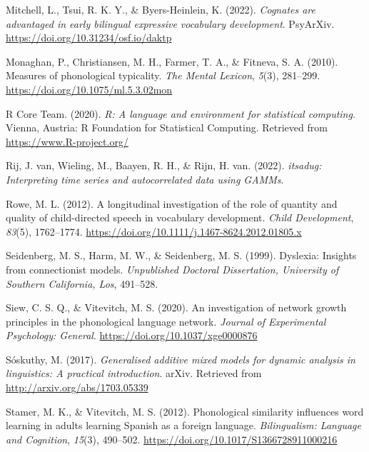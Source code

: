 \documentclass[
  man]{apa6}
\newlength{\cslhangindent}
\newlength{\cslentryspacingunit} %
\newenvironment{CSLReferences}[2] %
 {%
  \setlength{\parindent}{0pt}
  \ifodd #1
  \let\oldpar\par
  \def\par{\hangindent=\cslhangindent\oldpar}
  \fi
  \setlength{\parskip}{#2\cslentryspacingunit}
 }%
 {}
\begin{document}
\begin{CSLReferences}{1}{0}
\leavevmode{}%
Mitchell, L., Tsui, R. K. Y., \& Byers-Heinlein, K. (2022). \emph{Cognates are advantaged in early bilingual expressive vocabulary development}. {PsyArXiv}. \url{https://doi.org/10.31234/osf.io/daktp}

\leavevmode{}%
Monaghan, P., Christiansen, M. H., Farmer, T. A., \& Fitneva, S. A. (2010). Measures of phonological typicality. \emph{The Mental Lexicon}, \emph{5}(3), 281--299. \url{https://doi.org/10.1075/ml.5.3.02mon}

\leavevmode{}%
R Core Team. (2020). \emph{R: A language and environment for statistical computing}. Vienna, Austria: R Foundation for Statistical Computing. Retrieved from \url{https://www.R-project.org/}

\leavevmode{}%
Rij, J. van, Wieling, M., Baayen, R. H., \& Rijn, H. van. (2022). \emph{{itsadug}: Interpreting time series and autocorrelated data using GAMMs}.

\leavevmode{}%
Rowe, M. L. (2012). A longitudinal investigation of the role of quantity and quality of child-directed speech in vocabulary development. \emph{Child Development}, \emph{83}(5), 1762--1774. \url{https://doi.org/10.1111/j.1467-8624.2012.01805.x}

\leavevmode{}%
Seidenberg, M. S., Harm, M. W., \& Seidenberg, M. S. (1999). Dyslexia: Insights from connectionist models. \emph{Unpublished Doctoral Dissertation, University of Southern California, Los}, 491--528.

\leavevmode{}%
Siew, C. S. Q., \& Vitevitch, M. S. (2020). An investigation of network growth principles in the phonological language network. \emph{Journal of Experimental Psychology: General}. \url{https://doi.org/10.1037/xge0000876}

\leavevmode{}%
Sóskuthy, M. (2017). \emph{Generalised additive mixed models for dynamic analysis in linguistics: A practical introduction}. arXiv. Retrieved from \url{http://arxiv.org/abs/1703.05339}

\leavevmode{}%
Stamer, M. K., \& Vitevitch, M. S. (2012). Phonological similarity influences word learning in adults learning {Spanish} as a foreign language. \emph{Bilingualism: Language and Cognition}, \emph{15}(3), 490--502. \url{https://doi.org/10.1017/S1366728911000216}


\end{CSLReferences}
\end{document}
